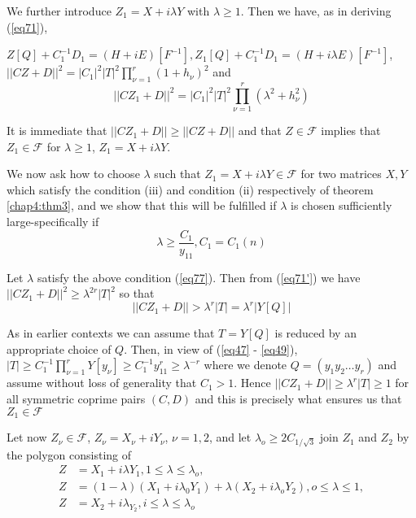 We further introduce $Z_1 = X + i \lambda Y$ with $\lambda \geq
1$. Then we have, as in deriving (\ref{eq71}), 

$Z[Q]+C^{-1}_1 D_1=(H +iE)[F^{-1}],Z_1[Q]+C^{-1}_1D_1 = (H+i
\lambda E)[F^{-1}]$,\break $||CZ + D||^2=|C_1|^2 |T|^2 \prod \limits^{r}_{\nu
  =1}( 1+h_\nu)^2 $ and 
\begin{equation*}
|| CZ_1 + D ||^2 = | C_1 |^2 | T |^2 \prod \limits^{r}_{\nu
  =1}(\lambda^2 + h^2_\nu ) \tag*{$(71)'$}\label{eq71'}   
\end{equation*}\pageoriginale

It is immediate that $|| CZ_1+D|| \geq || CZ+D ||$ and that $Z \in
\mathcal{F}$ implies that $Z_1 \in \mathcal{F}$ for $\lambda \geq 1$,
$Z_1 = X + i \lambda Y$. 
 
We now ask how to choose $\lambda$ such that $Z_1 = X + i \lambda Y
\in \mathcal{F}$ for two matrices $X, Y$ which satisfy the condition
(iii) and condition (ii) respectively of theorem \ref{chap4:thm3}, and
we show that this will be fulfilled if $\lambda$ is chosen sufficiently
large-specifically if  
\begin{equation*}
\lambda \geq \frac{C_1}{y_{11}}, C_1 = C_1 (n) \tag{77}\label{eq77}  
\end{equation*}

Let $\lambda$ satisfy the above condition (\ref{eq77}). Then from
(\ref{eq71'}) we 
have $|| CZ_1 + D||^2 \geq \lambda^{2r}|T|^2$ so that 
$$
|| CZ_1 + D || > \lambda^r | T | = \lambda^r | Y[Q] | 
$$

As in earlier contexts we can assume that $T=Y[Q]$ is reduced by an
appropriate choice of $Q$. Then, in view of (\ref{eq47} - \ref{eq49}),
$| T | \geq 
C^{-1}_1 \prod\limits^{r}_{\nu =1} Y[y_\nu] \geq
C^{-1}_1 y^r_{11}\geq \lambda^{-r} $ where we denote $Q =
(y_1 y_2 \ldots y_r)$ and assume without
loss of generality that $C_1 > 1$. Hence $||CZ_1+D||\geq \lambda^r |T|
\geq 1 $ for all symmetric coprime pairs $(C, D)$ and this is
precisely what ensures us that $Z_1 \in \mathcal{F}$ 

Let now $Z_\nu \in \mathscr{F}$, $Z_\nu = X_\nu + i Y_\nu$, $\nu
=1, 2$, and let $\lambda_o \geq 2C_{1 / \sqrt{3}}$ join $Z_1$ and
$Z_2$ by the polygon consisting of 
\begin{align*}
 Z & = X_1 + i \lambda Y_1, 1  \leq \lambda \leq \lambda_o ,
 \tag{78}\label{eq78}   \\
 Z & = (1-\lambda ) (X_1 + i \lambda_0 Y_1) + \lambda (X_2 + i \lambda_o
 Y_2), o \leq \lambda \leq 1,\tag{79}\label{eq79}   \\
Z & = X_2 + i	 \lambda_{Y_2}, i \leq \lambda \leq \lambda_o
\tag{80}\label{eq80}   
\end{align*}\pageoriginale
 
